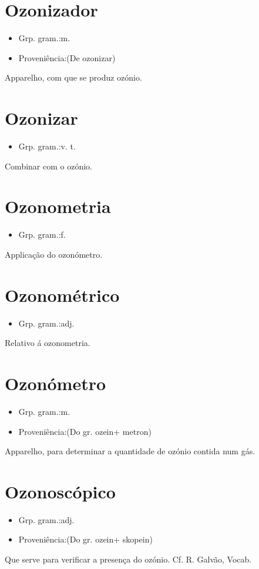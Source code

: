 \section{Ozonizador}
\begin{itemize}
\item {Grp. gram.:m.}
\end{itemize}
\begin{itemize}
\item {Proveniência:(De \textunderscore ozonizar\textunderscore )}
\end{itemize}
Apparelho, com que se produz ozónio.
\section{Ozonizar}
\begin{itemize}
\item {Grp. gram.:v. t.}
\end{itemize}
Combinar com o ozónio.
\section{Ozonometria}
\begin{itemize}
\item {Grp. gram.:f.}
\end{itemize}
Applicação do ozonómetro.
\section{Ozonométrico}
\begin{itemize}
\item {Grp. gram.:adj.}
\end{itemize}
Relativo á ozonometria.
\section{Ozonómetro}
\begin{itemize}
\item {Grp. gram.:m.}
\end{itemize}
\begin{itemize}
\item {Proveniência:(Do gr. \textunderscore ozein\textunderscore  + \textunderscore metron\textunderscore )}
\end{itemize}
Apparelho, para determinar a quantidade de ozónio contida num gás.
\section{Ozonoscópico}
\begin{itemize}
\item {Grp. gram.:adj.}
\end{itemize}
\begin{itemize}
\item {Proveniência:(Do gr. \textunderscore ozein\textunderscore  + \textunderscore skopein\textunderscore )}
\end{itemize}
Que serve para verificar a presença do ozónio. Cf. R. Galvão, \textunderscore Vocab.\textunderscore 
